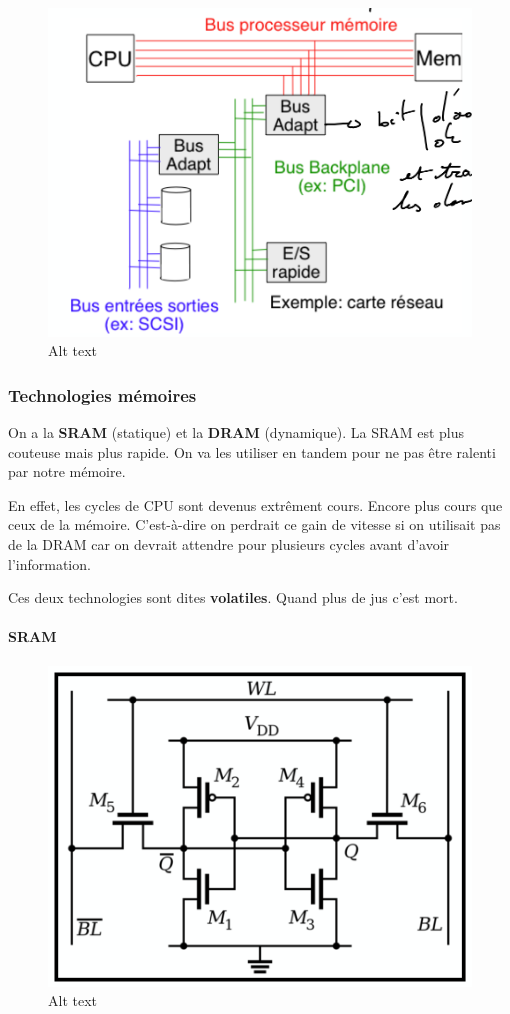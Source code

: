 \begin{figure}
\centering
\includegraphics{image-7.png}
\caption{Alt text}
\end{figure}

\subsubsection{Technologies mémoires}\label{technologies-muxe9moires}

On a la \textbf{SRAM} (statique) et la \textbf{DRAM} (dynamique). La
SRAM est plus couteuse mais plus rapide. On va les utiliser en tandem
pour ne pas être ralenti par notre mémoire.

En effet, les cycles de CPU sont devenus extrêment cours. Encore plus
cours que ceux de la mémoire. C'est-à-dire on perdrait ce gain de
vitesse si on utilisait pas de la DRAM car on devrait attendre pour
plusieurs cycles avant d'avoir l'information.

Ces deux technologies sont dites \textbf{volatiles}. Quand plus de jus
c'est mort.

\paragraph{SRAM}\label{sram}

\begin{figure}
\centering
\includegraphics{image-8.png}
\caption{Alt text}
\end{figure}

